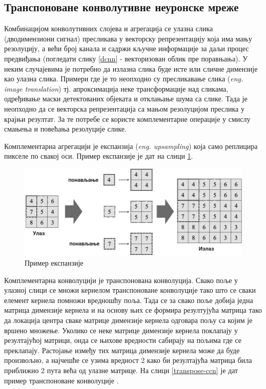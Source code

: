 \documentclass[11pt,oneside]{memoir}
\begin{document}
\subsection{Транспоноване конволутивне неуронске мреже}

Комбинацијом конволутивних слојева и агрегација се улазна слика (дводимензиони сигнал) пресликава у векторску репрезентацију која има мању резолуцију, 
а већи број канала и садржи кључне информације за даљи процес предвиђања (погледати слику \ref{dcnn} - векторизован облик пре поравњања). 
У неким случајевима је потребно да излазна слика буде 
исте или сличне димензије као улазна слика. Примери где је то неопходно су пресликавање слика (\textit{eng. image translation}) тј. апроксимација
неке трансформације над сликама, одређивање маски детектованих објеката и отклањање шума са слике. Тада је неопходно да се
векторска репрезентација са мањом резолуцијом преслика у крајњи резултат. За те потребе се користе комплементарне операције у смислу
смањења и повећања резолуције слике. 

Комплементарна агрегацији је експанзија (\textit{eng. upsampling}) која само реплицира пикселе по свакој оси.
Пример експанзије је дат на слици \ref{upsampling}. 

\begin{figure}[H]
  \centering
  \includegraphics[width=1.0\textwidth]{images/upsampling.png}
  \caption{Пример експанзије \label{upsampling}}
\end{figure}

Комплементарна конволуцији је транспонована конволуција. Свако поље у улазној слици се множи кернелом транспоноване конволуције тако што
се сваки елемент кернела помножи вредношћу поља. Тада се за свако поље добија једна матрица димензије кернела и на основу њих се формира резултујућа
матрица тако да локација центра сваке матрице димензије кернела одговара пољу са којим је вршено множење. Уколико се неке матрице димензије кернела
поклапају у резултајућој матрици, онда се њихове вредности сабирају на пољима где се преклапају. Растојање између тих матрица димензије кернела
може да буде произвољно, а најчешће се узима вредност 2 како би резултајућа матрица била приближно 2 пута већа од улазне матрице.
На слици \ref{transpose-ccn} је дат пример транспоноване конволуције \cite{dive_into_deep_learning}.
\end{document}
